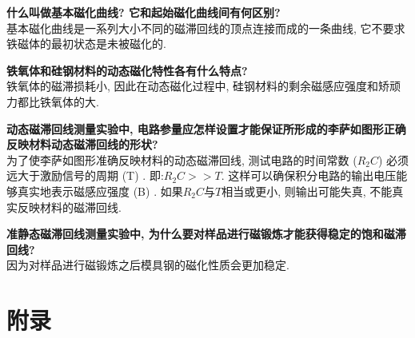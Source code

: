 \documentclass[zihao=5, UTF8]{article}
\theoremstyle{MyLineTheoremStyle} %
\theoremstyle{MyBlockTheoremStyle} %
\theoremstyle{MySubsubsectionStyle} %
\begin{document}
\textbf{什么叫做基本磁化曲线? 它和起始磁化曲线间有何区别? }
~\\
基本磁化曲线是一系列大小不同的磁滞回线的顶点连接而成的一条曲线, 它不要求铁磁体的最初状态是未被磁化的. 

\textbf{铁氧体和硅钢材料的动态磁化特性各有什么特点? }
~\\
铁氧体的磁滞损耗小, 因此在动态磁化过程中, 硅钢材料的剩余磁感应强度和矫顽力都比铁氧体的大. 

\textbf{动态磁滞回线测量实验中, 电路参量应怎样设置才能保证所形成的李萨如图形正确反映材料动态磁滞回线的形状? }
~\\
为了使李萨如图形准确反映材料的动态磁滞回线, 测试电路的时间常数 ($R_2C$) 必须远大于激励信号的周期 (T) . 即:$ R_2C >> T $. 这样可以确保积分电路的输出电压能够真实地表示磁感应强度 (B) . 如果$R_2C$与$T$相当或更小, 则输出可能失真, 不能真实反映材料的磁滞回线. 

\textbf{准静态磁滞回线测量实验中, 为什么要对样品进行磁锻炼才能获得稳定的饱和磁滞回线? }
~\\
因为对样品进行磁锻炼之后模具钢的磁化性质会更加稳定. 

\section{附录}


\end{document}

